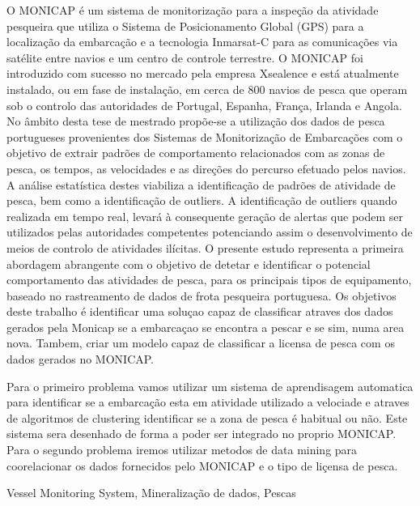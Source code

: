 \abstractPT  %

O MONICAP é um sistema de monitorização para a inspeção da atividade pesqueira que utiliza o Sistema de Posicionamento Global (GPS) para a localização da embarcação e a tecnologia Inmarsat-C para as comunicações via satélite entre navios e um centro de controle terrestre. O MONICAP foi introduzido com sucesso no mercado pela empresa Xsealence e está atualmente instalado, ou em fase de instalação, em cerca de 800 navios de pesca que operam sob o controlo das autoridades de Portugal, Espanha, França, Irlanda e Angola. No âmbito desta tese de mestrado propõe-se a utilização dos dados de pesca portugueses provenientes dos Sistemas de Monitorização de Embarcações com o objetivo de extrair padrões de comportamento relacionados com as zonas de pesca, os tempos, as velocidades e as direções do percurso efetuado pelos navios. A análise estatística destes viabiliza a identificação de padrões de atividade de pesca, bem como a identificação de outliers. A identificação de outliers quando realizada em tempo real, levará à consequente geração de alertas que podem ser utilizados pelas autoridades competentes potenciando assim o desenvolvimento de meios de controlo de atividades ilícitas. O presente estudo representa a primeira abordagem abrangente com o objetivo de detetar e identificar o potencial comportamento das atividades de pesca, para os principais tipos de equipamento, baseado no rastreamento de dados de frota pesqueira portuguesa.
Os objetivos deste trabalho é identificar uma soluçao capaz de classificar atraves dos dados gerados pela Monicap se a embarcaçao se encontra a pescar e se sim, numa area nova. Tambem, criar um modelo capaz de classificar a licensa de pesca com os dados gerados no MONICAP.

Para o primeiro problema vamos utilizar um sistema de aprendisagem automatica para identificar se a embarcação esta em atividade utilizado a velociade e atraves de algoritmos de clustering identificar se a zona de pesca é habitual ou não.
Este sistema sera desenhado de forma a poder ser integrado no proprio MONICAP.
Para o segundo problema iremos utilizar metodos de data mining para coorelacionar os dados fornecidos pelo MONICAP e o tipo de liçensa de pesca.

\begin{keywords}
Vessel Monitoring System, Mineralização de dados, Pescas
\end{keywords}
